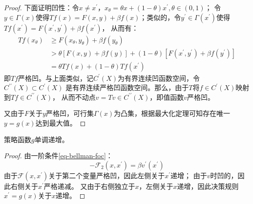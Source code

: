 \begin{proof}
    下面证明凹性：令$x \neq x^{\prime}$，$x_\theta=\theta x+(1-\theta) x^{\prime}, \theta \in(0,1)$；
    令$y \in \Gamma(x)$使得$T f(x)=F(x, y)+\beta f(x)$；类似的，令$y^{\prime} \in \Gamma\left(x^{\prime}\right)$使得
    $T f\left(x^{\prime}\right)=F\left(x^{\prime}, y^{\prime}\right)+\beta f\left(x^{\prime}\right)$，
    从而有：
    \begin{equation*}
        \begin{aligned}
            T f\left(x_\theta\right) & \geq F\left(x_\theta, y_\theta\right)+\beta f\left(y_\theta\right) \\
            & >\theta[F(x, y)+\beta f(y)]+(1-\theta)\left[F\left(x^{\prime}, y^{\prime}\right)+
                \beta f\left(y^{\prime}\right)\right] \\
            & =\theta T f(x)+(1-\theta) T f\left(x^{\prime}\right)
        \end{aligned}
    \end{equation*}
    即$Tf$严格凹。与上面类似，记$C^{\prime}(X)$为有界连续凹函数空间，令$C^{\prime\prime}(X)\subset C^{\prime}(X)$
    是有界连续严格凹函数空间。那么，由于$T$将$f\in C^{\prime}(X)$映射到$Tf\in C^{\prime\prime}(X)$，
    从而不动点$v=Tv\in C^{\prime\prime}(X)$，即值函数$v$严格凹。

    又由于$F$关于$y$严格凹，可行集$\Gamma(x)$为凸集，根据最大化定理可知存在唯一$y=g(x)$达到最大值。
\end{proof}

\begin{property}
    策略函数$g$单调递增。
\end{property}
\begin{proof}
    由一阶条件\cref{eq-bellman-foc}：
    \begin{equation*}
        -\mathcal{F}_2(x,x^{\prime}) = \beta v^{\prime}(x^{\prime})
    \end{equation*}
    由于$\mathcal{F}(x,x^{\prime})$关于第二个变量严格凹，因此左侧关于$x^{\prime}$递增；
    由于$v$时凹的，因此右侧关于$x^{\prime}$严格递减。
    又由于右侧独立于$x$，左侧关于$x$递增，因此决策规则$x^{\prime}=g(x)$关于$x$递增。
\end{proof}